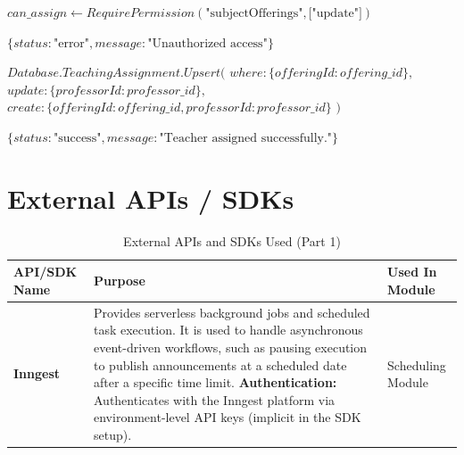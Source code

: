 \begin{algorithm}[H]
\caption{Offering Creation Workflow (Part 2: Faculty Assignment)}
\begin{algorithmic}[1]


    \State {}
    \State $can\_assign \gets RequirePermission(\text{"subjectOfferings"}, \text{["update"]})$

        \State \Return $\{status: \text{"error"}, message: \text{"Unauthorized access"}\}$
    \EndIf

    \State {}
    \State $Database.TeachingAssignment.Upsert($
    \State \quad $where: \{ offeringId: offering\_id \},$
    \State \quad $update: \{ professorId: professor\_id \},$
    \State \quad $create: \{ offeringId: offering\_id, professorId: professor\_id \}$
    \State $)$

    \State \Return $\{status: \text{"success"}, message: \text{"Teacher assigned successfully."}\}$
\EndFunction

\end{algorithmic}
\end{algorithm}





\section{External APIs / SDKs}
\begin{table}[H]
    \centering
    \renewcommand{\arraystretch}{1.5}
    \begin{tabular}{|p{3cm}|p{8cm}|p{4cm}|}
        \hline
        \textbf{API/SDK Name} & \textbf{Purpose} & \textbf{Used In Module} \\
        \hline
        \textbf{Inngest} &
        Provides serverless background jobs and scheduled task execution. It is used to handle asynchronous event-driven workflows, such as pausing execution to publish announcements at a scheduled date after a specific time limit. \newline
        \textbf{Authentication:} Authenticates with the Inngest platform via environment-level API keys (implicit in the SDK setup). &
        Scheduling Module \\
        \hline
    \end{tabular}
    \caption{External APIs and SDKs Used (Part 1)}
    \label{tab:external_apis_1}
\end{table}

